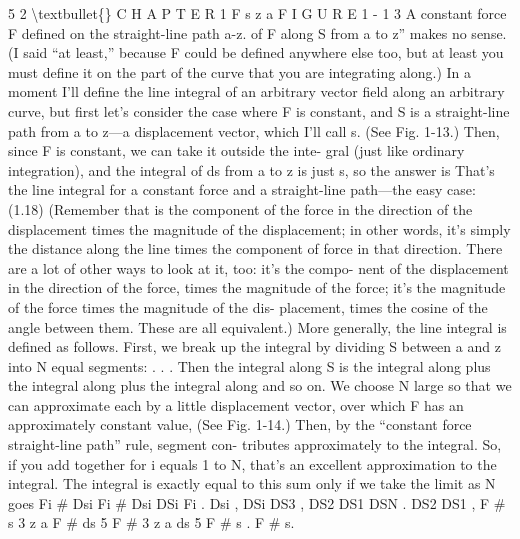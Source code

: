 \documentclass[10pt,oneside]{article}
\begin{document}
5 2 \textbackslash{}textbullet\{\} C H A P T E R  1 F s z a F I G U R E 1 - 1 3 A constant force F defined on the straight-line path a-z. of F along S from a to z” makes no sense. (I said “at least,” because F could be defined anywhere else too, but at least you must define it on the part of the curve that you are integrating along.) In a moment I’ll define the line integral of an arbitrary vector field along an arbitrary curve, but first let’s consider the case where F is constant, and S is a straight-line path from a to z---a displacement vector, which I’ll call s. (See Fig. 1-13.) Then, since F is constant, we can take it outside the inte- gral (just like ordinary integration), and the integral of ds from a to z is just s, so the answer is That’s the line integral for a constant force and a straight-line path---the easy case: (1.18) (Remember that is the component of the force in the direction of the displacement times the magnitude of the displacement; in other words, it’s simply the distance along the line times the component of force in that direction. There are a lot of other ways to look at it, too: it’s the compo- nent of the displacement in the direction of the force, times the magnitude of the force; it’s the magnitude of the force times the magnitude of the dis- placement, times the cosine of the angle between them. These are all equivalent.) More generally, the line integral is defined as follows. First, we break up the integral by dividing S between a and z into N equal segments: . . . Then the integral along S is the integral along plus the integral along plus the integral along and so on. We choose N large so that we can approximate each by a little displacement vector, over which F has an approximately constant value, (See Fig. 1-14.) Then, by the “constant force straight-line path” rule, segment con- tributes approximately to the integral. So, if you add together for i equals 1 to N, that’s an excellent approximation to the integral. The integral is exactly equal to this sum only if we take the limit as N goes Fi \# Dsi Fi \# Dsi DSi Fi . Dsi , DSi DS3 , DS2 DS1 DSN . DS2 DS1 , F \# s 3 z a F \# ds 5 F \# 3 z a ds 5 F \# s . F \# s.\par
\end{document}
